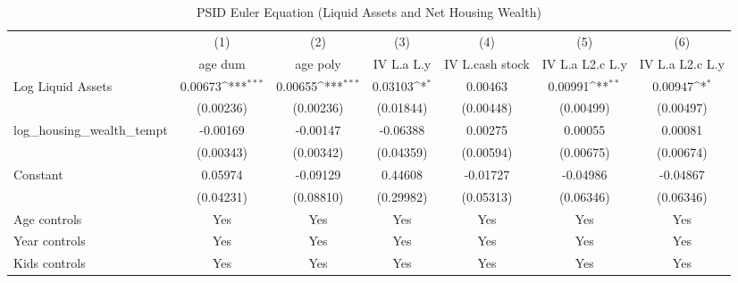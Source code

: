 {
\def\sym#1{\ifmmode^{#1}\else\(^{#1}\)\fi}
\begin{longtable}{l*{6}{c}}
\caption{PSID Euler Equation (Liquid Assets and Net Housing Wealth)}\\
\toprule\endfirsthead\midrule\endhead\midrule\endfoot\endlastfoot
                    &\multicolumn{1}{c}{(1)}&\multicolumn{1}{c}{(2)}&\multicolumn{1}{c}{(3)}&\multicolumn{1}{c}{(4)}&\multicolumn{1}{c}{(5)}&\multicolumn{1}{c}{(6)}\\
                    &\multicolumn{1}{c}{age dum}&\multicolumn{1}{c}{age poly}&\multicolumn{1}{c}{IV L.a L.y}&\multicolumn{1}{c}{IV L.cash stock}&\multicolumn{1}{c}{IV L.a L2.c L.y}&\multicolumn{1}{c}{IV L.a L2.c L.y}\\
\midrule
Log Liquid Assets   &     0.00673\sym{***}&     0.00655\sym{***}&     0.03103\sym{*}  &     0.00463         &     0.00991\sym{**} &     0.00947\sym{*}  \\
                    &   (0.00236)         &   (0.00236)         &   (0.01844)         &   (0.00448)         &   (0.00499)         &   (0.00497)         \\
\addlinespace
log\_housing\_wealth\_tempt&    -0.00169         &    -0.00147         &    -0.06388         &     0.00275         &     0.00055         &     0.00081         \\
                    &   (0.00343)         &   (0.00342)         &   (0.04359)         &   (0.00594)         &   (0.00675)         &   (0.00674)         \\
\addlinespace
Constant            &     0.05974         &    -0.09129         &     0.44608         &    -0.01727         &    -0.04986         &    -0.04867         \\
                    &   (0.04231)         &   (0.08810)         &   (0.29982)         &   (0.05313)         &   (0.06346)         &   (0.06346)         \\
\addlinespace
Age controls        &         Yes         &         Yes         &         Yes         &         Yes         &         Yes         &         Yes         \\
\addlinespace
Year controls       &         Yes         &         Yes         &         Yes         &         Yes         &         Yes         &         Yes         \\
\addlinespace
Kids controls       &         Yes         &         Yes         &         Yes         &         Yes         &         Yes         &         Yes         \\
\midrule

\end{longtable}}

